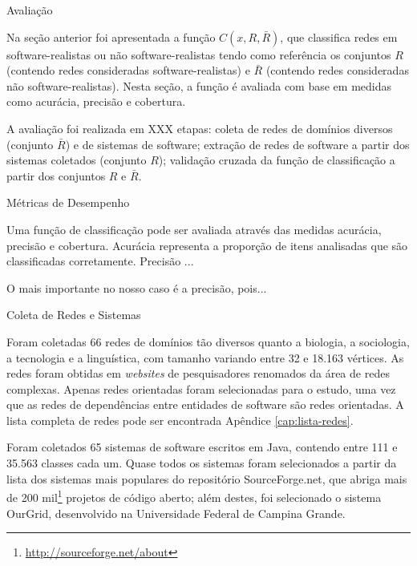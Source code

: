 \begin{section}{Avaliação}

	Na seção anterior foi apresentada a função $C(x, R, \bar{R})$, que classifica redes em software-realistas ou não software-realistas tendo como referência os conjuntos $R$ (contendo redes consideradas software-realistas) e $\bar{R}$ (contendo redes consideradas não software-realistas). Nesta seção, a função é avaliada com base em medidas como acurácia, precisão e cobertura.
	
	A avaliação foi realizada em XXX etapas: 
	coleta de redes de domínios diversos (conjunto $\bar{R}$) e de sistemas de software; 
	extração de redes de software a partir dos sistemas coletados (conjunto $R$);
	validação cruzada da função de classificação a partir dos conjuntos $R$ e $\bar{R}$.

\begin{subsection}{Métricas de Desempenho}

	
	Uma função de classificação pode ser avaliada através das medidas acurácia, precisão e cobertura. Acurácia representa a proporção de itens analisadas que são classificadas corretamente. Precisão 
	...
	

	O mais importante no nosso caso é a precisão, pois...
	
\end{subsection}
	
\begin{subsection}{Coleta de Redes e Sistemas}

		Foram coletadas 66 redes de domínios tão diversos quanto a biologia, a sociologia, a tecnologia e a linguística, com tamanho variando entre 32 e 18.163 vértices. As redes foram obtidas em \emph{websites} de pesquisadores renomados da área de redes complexas. Apenas redes orientadas foram selecionadas para o estudo, uma vez que as redes de dependências entre entidades de software são redes orientadas. A lista completa de redes pode ser encontrada Apêndice \ref{cap:lista-redes}.

	  Foram coletados 65 sistemas de software escritos em Java, contendo entre 111 e 35.563 classes cada um. Quase todos os sistemas foram selecionados a partir da lista dos sistemas mais populares do repositório SourceForge.net, que abriga mais de 200 mil\footnote{\url{http://sourceforge.net/about}} projetos de código aberto; além destes, foi selecionado o sistema OurGrid, desenvolvido na Universidade Federal de Campina Grande. 


\end{subsection}
\end{section}
